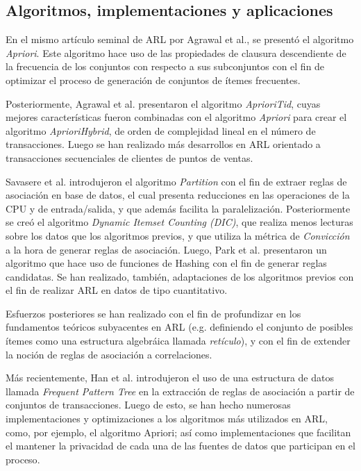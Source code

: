 \subsection{Algoritmos, implementaciones y aplicaciones}

En el mismo artículo seminal de ARL por Agrawal et al.\cite{agrawal1993mining}, se presentó el algoritmo \textit{Apriori}. Este algoritmo hace uso de las propiedades de clausura descendiente de la frecuencia de los conjuntos con respecto a sus subconjuntos con el fin de optimizar el proceso de generación de conjuntos de ítemes frecuentes.

Posteriormente, Agrawal et al. presentaron el algoritmo \textit{AprioriTid}, cuyas mejores características fueron combinadas con el algoritmo \textit{Apriori} para crear el algoritmo \textit{AprioriHybrid}, de orden de complejidad lineal en el número de transacciones\cite{agrawal1994fast}. Luego se han realizado más desarrollos en ARL orientado a transacciones secuenciales de clientes de puntos de ventas\cite{agrawal1995mining}.

Savasere et al. introdujeron el algoritmo \textit{Partition}\cite{savasere1995efficient} con el fin de extraer reglas de asociación en base de datos, el cual presenta reducciones en las operaciones de la CPU y de entrada/salida, y que además facilita la paralelización. Posteriormente se creó el algoritmo \textit{Dynamic Itemset Counting (DIC)}\cite{brin1997dynamic}, que realiza menos lecturas sobre los datos que los algoritmos previos, y que utiliza la métrica de \textit{Convicción} a la hora de generar reglas de asociación. Luego, Park et al. presentaron un algoritmo que hace uso de funciones de Hashing con el fin de generar reglas candidatas\cite{park1995effective}. Se han realizado, también, adaptaciones de los algoritmos previos con el fin de realizar ARL en datos de tipo cuantitativo\cite{srikant1996mining}.

Esfuerzos posteriores se han realizado con el fin de profundizar en los fundamentos teóricos subyacentes en ARL (e.g. definiendo el conjunto de posibles ítemes como una estructura algebráica llamada \textit{retículo})\cite{zaki1998theoretical}, y con el fin de extender la noción de reglas de asociación a correlaciones\cite{brin1997beyond}.

Más recientemente, Han et al. introdujeron el uso de una estructura de datos llamada \textit{Frequent Pattern Tree}\cite{han2004mining} en la extracción de reglas de asociación a partir de conjuntos de transacciones. Luego de esto, se han hecho numerosas implementaciones y optimizaciones a los algoritmos más utilizados en ARL, como, por ejemplo, el algoritmo Apriori\cite{bodon2010fast}; así como implementaciones que facilitan el mantener la privacidad de cada una de las fuentes de datos que participan en el proceso\cite{evfimievski2004privacy}.

